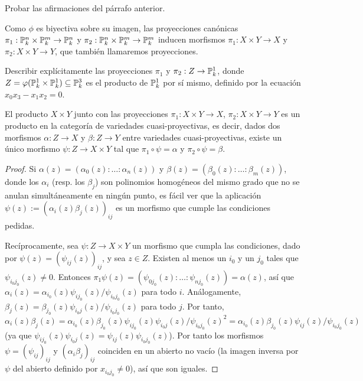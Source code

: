 \documentclass[ACGA.tex]{subfiles}
\begin{document}
\begin{ejer}
 Probar las afirmaciones del párrafo anterior.
\end{ejer}

Como $\phi$ es biyectiva sobre su imagen, las proyecciones canónicas $\pi_1:\mathbb{P}^n_k\times\mathbb{P}^m_k\to \mathbb{P}^n_k$ y $\pi_2:\mathbb{P}^n_k\times\mathbb{P}^m_k\to\mathbb{P}^m_k$ inducen morfismos $\pi_1:X\times Y\to X$ y $\pi_2:X\times Y\to Y$, que también llamaremos proyecciones. 
 
\begin{ejer}
 Describir explícitamente las proyecciones $\pi_1$ y $\pi_2:Z\to\mathbb{P}^1_k$, donde $Z=\varphi(\mathbb{P}^1_k\times\mathbb{P}^1_k)\subseteq\mathbb{P}^3_k$ es el producto de $\mathbb{P}^1_k$ por sí mismo, definido por la ecuación $x_0x_3-x_1x_2=0$. 
\end{ejer}


\begin{prop}
 El producto $X\times Y$ junto con las proyecciones $\pi_1:X\times Y\to X$, $\pi_2:X\times Y\to Y$ es un producto en la categoría de variedades cuasi-proyectivas, es decir, dados dos morfismos $\alpha:Z\to X$ y $\beta:Z\to Y$ entre variedades cuasi-proyectivas, existe un único morfismo $\psi:Z\to X\times Y$ tal que $\pi_1\circ\psi=\alpha$ y $\pi_2\circ\psi=\beta$.
\end{prop}

\begin{proof}
 Si $\alpha(z)=(\alpha_0(z):\ldots:\alpha_n(z))$ y $\beta(z)=(\beta_0(z):\ldots:\beta_m(z))$, donde los $\alpha_i$ (resp. los $\beta_j$) son polinomios homogéneos del mismo grado que no se anulan simultáneamente en ningún punto, es fácil ver que la aplicación $\psi(z):=(\alpha_i(z)\beta_j(z))_{ij}$ es un morfismo que cumple las condiciones pedidas. 

 Recíprocamente, sea $\psi:Z\to X\times Y$ un morfismo que cumpla las condiciones, dado por $\psi(z)=(\psi_{ij}(z))_{ij}$, y sea $z\in Z$. Existen al menos un $i_0$ y un $j_0$ tales que $\psi_{i_0j_0}(z)\neq 0$. Entonces $\pi_1\psi(z)=(\psi_{0j_0}(z):\ldots:\psi_{nj_0}(z))=\alpha(z)$, así que $\alpha_i(z)=\alpha_{i_0}(z)\psi_{ij_0}(z)/\psi_{i_0j_0}(z)$ para todo $i$. Análogamente, $\beta_j(z)=\beta_{j_0}(z)\psi_{i_0j}(z)/\psi_{i_0j_0}(z)$ para todo $j$. Por tanto, $$\alpha_i(z)\beta_j(z)=\alpha_{i_0}(z)\beta_{j_0}(z)\psi_{ij_0}(z)\psi_{i_0j}(z)/\psi_{i_0j_0}(z)^2=\alpha_{i_0}(z)\beta_{j_0}(z)\psi_{ij}(z)/\psi_{i_0j_0}(z)$$ (ya que $\psi_{ij_0}(z)\psi_{i_0j}(z)=\psi_{ij}(z)\psi_{i_0j_0}(z)$). Por tanto los morfismos $\psi=(\psi_{ij})_{ij}$ y $(\alpha_i\beta_j)_{ij}$ coinciden en un abierto no vacío (la imagen inversa por $\psi$ del abierto definido por $x_{i_0j_0}\neq 0$), así que son iguales.
\end{proof}
\end{document}
